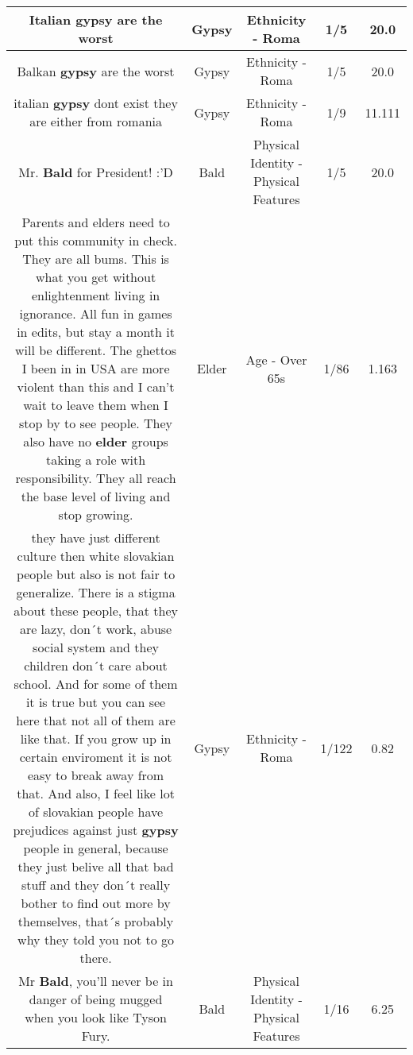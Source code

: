 \documentclass[11pt]{article}
\newlength\mylength
\begin{document}
\begin{center}
\begin{longtable}{|C{.65\mylength}|C{.30\mylength}|C{.12\mylength}|C{.12\mylength}|C{.12\mylength}|}
  \small Italian \textbf{gypsy} are the worst\normalsize   & Gypsy & Ethnicity - Roma & 1/5 & 20.0 \\  \hline
  \small Balkan \textbf{gypsy} are the worst\normalsize   & Gypsy & Ethnicity - Roma & 1/5 & 20.0 \\  \hline
  \small italian \textbf{gypsy} dont exist they are either from romania\normalsize   & Gypsy & Ethnicity - Roma & 1/9 & 11.111 \\  \hline
  \small Mr. \textbf{Bald} for President! :'D\normalsize   & Bald & Physical Identity - Physical Features & 1/5 & 20.0 \\  \hline
  \small Parents and elders need to put this community in check. They are all bums. This is what you get without enlightenment living in ignorance. All fun in games in edits, but stay a month it will be different. The ghettos I been in in USA are more violent than this and I can't wait to leave them when I stop by to see people. They also have no \textbf{elder} groups taking a role with responsibility. They all reach the base level of living and stop growing.\normalsize   & Elder & Age - Over 65s & 1/86 & 1.163 \\  \hline
  \small they have just different culture then white slovakian people but also is not fair to generalize. There is a stigma about these people, that they are lazy, don´t work, abuse social system and they children don´t care about school. And for some of them it is true but you can see here that not all of them are like that. If you grow up in certain enviroment it is not easy to break away from that. And also, I feel like lot of slovakian people have prejudices against just \textbf{gypsy} people in general, because  they just belive all that bad stuff and they don´t really bother to find out more by themselves, that´s probably why they told you not to go there.\normalsize   & Gypsy & Ethnicity - Roma & 1/122 & 0.82 \\  \hline
  \small Mr \textbf{Bald}, you'll never be in danger of being mugged when you  look like Tyson Fury.\normalsize   & Bald & Physical Identity - Physical Features & 1/16 & 6.25 \\  \hline

\end{longtable}
\end{center}
\end{document}
